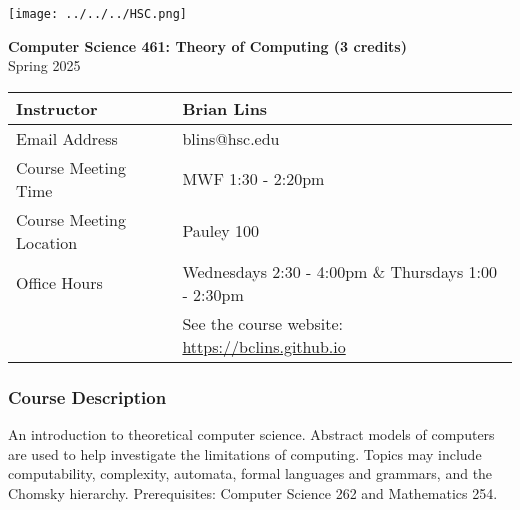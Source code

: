 \documentclass[10pt]{article}
\begin{document}
%


\begin{center}
\texttt{[image: ../../../HSC.png]} 
\bigskip

\textbf{Computer Science 461: Theory of Computing (3 credits)} \\
Spring 2025
\end{center}

\noindent
\begin{tabular}{|l|l|}
\hline
Instructor & Brian Lins \\ \hline
Email Address & blins@hsc.edu \\ \hline
Course Meeting Time & MWF 1:30 - 2:20pm \\ \hline
Course Meeting Location & Pauley 100 \\ \hline
Office Hours & Wednesdays 2:30 - 4:00pm \& Thursdays 1:00 - 2:30pm \\ 
& See the course website: \url{https://bclins.github.io} ~ \\ \hline
\end{tabular}

\subsubsection*{Course Description}

An introduction to theoretical computer science. Abstract models of computers are used to help investigate the limitations of computing. Topics may include computability, complexity, automata, formal languages and grammars, and the Chomsky hierarchy. Prerequisites: Computer Science 262 and Mathematics 254. 
\end{document}
